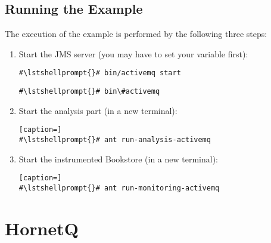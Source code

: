 \setPropertiesListing


\setPropertiesListing


\subsection{Running the Example}

 The execution of the example is performed by the following three steps:
\begin{enumerate}
\item Start the JMS server (you may have to set your  variable first):

\setBashListing
\begin{lstlisting}[caption=Start of the JMS server under UNIX-like systems]
#\lstshellprompt{}# bin/activemq start
\end{lstlisting}
\begin{lstlisting}[caption=Start of the JMS server under Windows]
#\lstshellprompt{}# bin\#activemq
\end{lstlisting}
\item Start the analysis part (in a new terminal):
\setBashListing
\begin{lstlisting}[caption=]
#\lstshellprompt{}# ant run-analysis-activemq
\end{lstlisting}
\item Start the instrumented Bookstore (in a new terminal):
\setBashListing
\begin{lstlisting}[caption=]
#\lstshellprompt{}# ant run-monitoring-activemq
\end{lstlisting}
\end{enumerate}


\section{HornetQ}\label{example:jms:hornetq}

